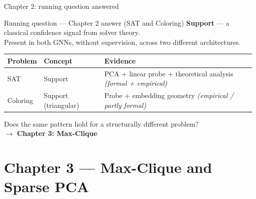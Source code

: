 \documentclass[aspectratio=169,10pt,dvipsnames]{beamer}
\begin{document}
\begin{frame}{Chapter 2: running question answered}

\begin{block}{Running question — Chapter 2 answer (SAT and Coloring)}
\large\centering
\textbf{Support} — a classical confidence signal from solver theory.\\
\small Present in both GNNs, without supervision, across two different architectures.
\end{block}

\medskip
\small\renewcommand{\arraystretch}{1.25}
\begin{tabular}{@{}llp{4.2cm}@{}}
\toprule
\textbf{Problem} & \textbf{Concept} & \textbf{Evidence} \\
\midrule
SAT & Support & PCA + linear probe + theoretical analysis \textit{(formal + empirical)} \\
Coloring & Support (triangular) & Probe + embedding geometry \textit{(empirical / partly formal)} \\
\bottomrule
\end{tabular}

\medskip
\begin{alertblock}{}
\small
Does the same pattern hold for a structurally different problem?\\
$\to$ \textbf{Chapter 3: Max-Clique}
\end{alertblock}

\end{frame}


\section{Chapter 3 — Max-Clique and Sparse PCA}
\end{document}
